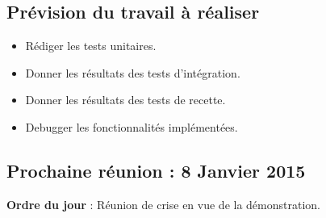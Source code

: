 \documentclass[12pt,a4paper]{article}
\begin{document}
\subsection*{Prévision du travail à réaliser}

\begin{itemize}[label = $\blacktriangleright$]
\item Rédiger les tests unitaires.

\item Donner les résultats des tests d'intégration.

\item Donner les résultats des tests de recette.

\item Debugger les fonctionnalités implémentées.
\end{itemize}

\subsection*{Prochaine réunion : 8 Janvier 2015}

\textbf{Ordre du jour} : Réunion de crise en vue de la démonstration.\\
\end{document}
